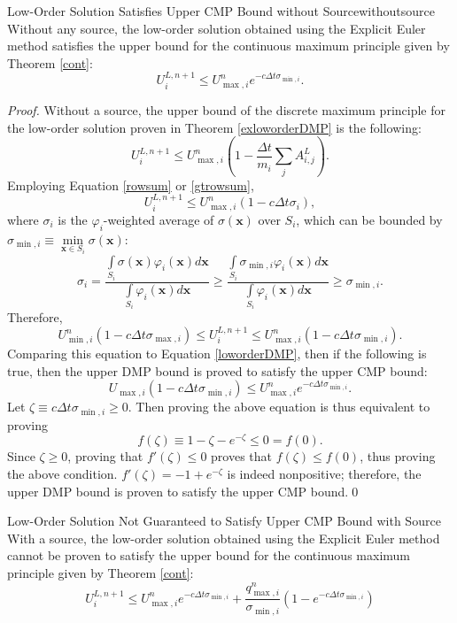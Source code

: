 \begin{corollary}{Low-Order Solution Satisfies Upper CMP Bound without Source}{withoutsource}
   Without any source, the low-order solution obtained using the Explicit Euler
   method satisfies the upper bound
   for the continuous maximum principle given by Theorem \ref{cont}:
   \begin{equation}\label{loworderDMP}
      U_i^{L,n+1} \le
      U_{\max,i}^n e^{-c\Delta t\sigma_{\min,i}}.
   \end{equation}
\end{corollary}

\begin{proof}
Without a source, the upper bound of the discrete maximum principle for the low-order solution
proven in Theorem \ref{exloworderDMP} is the following:
\[
   U_i^{L,n+1}\leq
   U_{\max,i}^n\left(1-\frac{\Delta t}{m_i}\sum\limits_j A^L_{i,j}\right).
\]
Employing Equation \eqref{rowsum} or \eqref{gtrowsum},
\[
   U_i^{L,n+1} \le
   U_{\max,i}^n(1-c\Delta t\sigma_i),
\]
where $\sigma_i$ is the $\varphi_i$-weighted average of $\sigma(\mathbf{x})$ over
$S_i$, which can be bounded by
$\sigma_{\min,i}\equiv\min\limits_{\mathbf{x}\in S_i}\sigma(\mathbf{x})$:
\[
   \sigma_i = \frac{\int\limits_{S_i}\sigma(\mathbf{x})\varphi_i(\mathbf{x})d\mathbf{x}}{\int\limits_{S_i}\varphi_i(\mathbf{x})d\mathbf{x}}
   \ge \frac{\int\limits_{S_i}\sigma_{\min,i}\varphi_i(\mathbf{x})d\mathbf{x}}{\int\limits_{S_i}\varphi_i(\mathbf{x})d\mathbf{x}}
   \ge \sigma_{\min,i}.
\]
Therefore,
\[
   U_{\min,i}^n(1-c\Delta t\sigma_{\max,i}) \le
   U_i^{L,n+1} \le
   U_{\max,i}^n(1-c\Delta t\sigma_{\min,i}).
\]
Comparing this equation to Equation \eqref{loworderDMP}, then if the following is true,
then the upper DMP bound is proved to satisfy the upper CMP bound:
\[
   U_{\max,i}(1-c\Delta t\sigma_{\min,i}) \le U_{\max,i}^n e^{-c\Delta t\sigma_{\min,i}}.
\]
Let $\zeta\equiv c\Delta t\sigma_{\min,i}\ge 0$. Then proving the above equation is
thus equivalent to proving
\[
   f(\zeta)\equiv 1-\zeta-e^{-\zeta} \le 0 = f(0).
\]
Since $\zeta\ge 0$, proving that $f'(\zeta)\le 0$ proves that $f(\zeta)\le f(0)$, thus
proving the above condition. $f'(\zeta)=-1+e^{-\zeta}$ is indeed nonpositive; therefore,
the upper DMP bound is proven to satisfy the upper CMP bound.\qed
\end{proof}
\begin{corollary}{Low-Order Solution Not Guaranteed to Satisfy Upper CMP Bound with Source}{}
   With a source, the low-order solution obtained using the Explicit Euler
   method cannot be proven to satisfy the upper bound
   for the continuous maximum principle given by Theorem \ref{cont}:
   \[
      U_i^{L,n+1} \le
      U_{\max,i}^n e^{-c\Delta t\sigma_{\min,i}}
      + \frac{q_{\max,i}^n}{\sigma_{\min,i}}(1-e^{-c\Delta t\sigma_{\min,i}})
   \]
\end{corollary}

